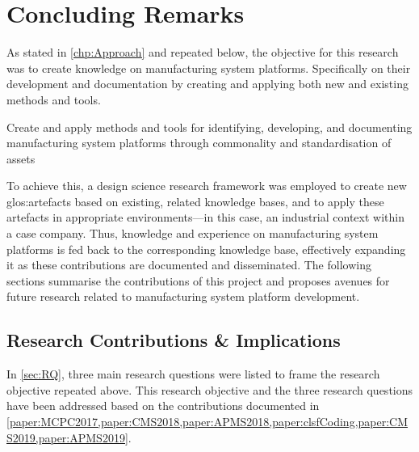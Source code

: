\chapter{Concluding Remarks}\label{chp:Conclusions}
As stated in \cref{chp:Approach} and repeated below, the objective for this research was to create knowledge on manufacturing system platforms.
Specifically on their development and documentation by creating and applying both new and existing methods and tools.
\begin{objective}
Create and apply methods and tools for identifying, developing, and documenting manufacturing system platforms through commonality and standardisation of assets
\end{objective}
To achieve this, a design science research framework was employed to create new \gls{glos:artefact}s based on existing, related knowledge bases, and to apply these artefacts in appropriate environments---in this case, an industrial context within a case company.
Thus, knowledge and experience on manufacturing system platforms is fed back to the corresponding knowledge base, effectively expanding it as these contributions are documented and disseminated.
The following sections summarise the contributions of this \PhD{} project and proposes avenues for future research related to manufacturing system platform development.

\section{Research Contributions \& Implications}
In \cref{sec:RQ}, three main research questions were listed to frame the research objective repeated above.
This research objective and the three research questions have been addressed based on the contributions documented in \cref{paper:MCPC2017,paper:CMS2018,paper:APMS2018,paper:clsfCoding,paper:CMS2019,paper:APMS2019}. 

